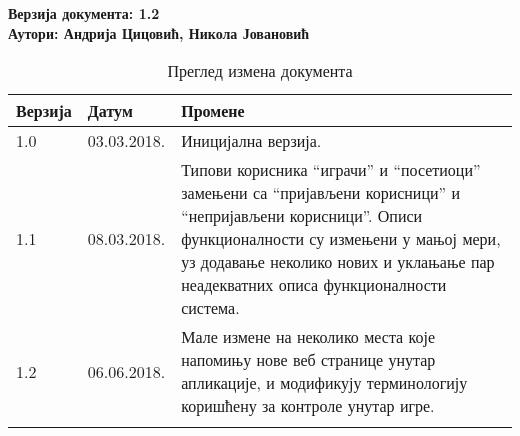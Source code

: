 \noindent
\textbf{Верзија документа: 1.2} \\
\textbf{Аутори: Андрија Цицовић, Никола Јовановић}

\begin{table}[h!]
\centering
\small
	
	\begin{tabular}{ || m{} | m{} | m{} || }
	\hline
	\textbf{Верзија} & \textbf{Датум} & \textbf{Промене} \\
	\hline
	\hline
	1.0 & 03.03.2018. & 
	Иницијална верзија. \\
	\hline
	1.1 & 08.03.2018. & 
	Типови корисника ``играчи'' и ``посетиоци'' замењени са ``пријављени корисници'' и 
	``непријављени корисници''. Описи функционалности су измењени у мањој мери, уз
	додавање неколико нових и уклањање пар неадекватних описа функционалности система.  \\
	\hline
	1.2 & 06.06.2018. &
    Мале измене на неколико места које напомињу нове веб странице унутар апликације,
    и модификују терминологију коришћену за контроле унутар игре.\\
	\hline
	& & \\
	\hline
	\end{tabular}
	\caption{Преглед измена документа}
	\label{table:1}
		
\end{table}
\newpage
